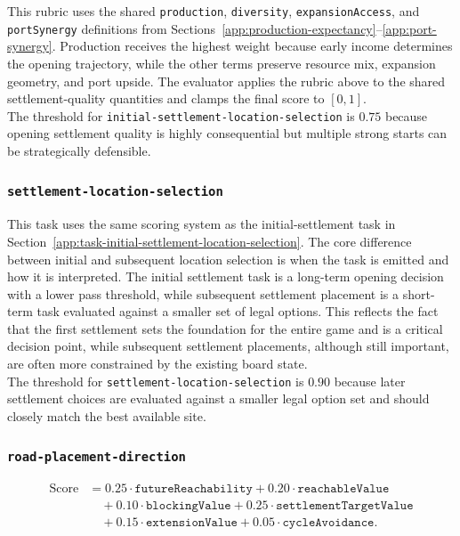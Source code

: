 \documentclass{article}
\begin{document}
This rubric uses the shared \texttt{production}, \texttt{diversity}, \texttt{expansionAccess}, and \texttt{portSynergy} definitions from Sections~\ref{app:production-expectancy}--\ref{app:port-synergy}. Production receives the highest weight because early income determines the opening trajectory, while the other terms preserve resource mix, expansion geometry, and port upside.
The evaluator applies the rubric above to the shared settlement-quality quantities and clamps the final score to $[0,1]$. 
\\
The threshold for \texttt{initial-settlement-location-selection} is $0.75$ because opening settlement quality is highly consequential but multiple strong starts can be strategically defensible.

\subsubsection{\texttt{settlement-location-selection}}
\label{app:task-settlement-location-selection}
This task uses the same scoring system as the initial-settlement task in Section~\ref{app:task-initial-settlement-location-selection}.
The core difference between initial and subsequent location selection is when the task is emitted and how it is interpreted. The initial settlement task is a long-term opening decision with a lower pass threshold, while subsequent settlement placement is a short-term task evaluated against a smaller set of legal options.
This reflects the fact that the first settlement sets the foundation for the entire game and is a critical decision point, while subsequent settlement placements, although still important, are often more constrained by the existing board state.
\\
The threshold for \texttt{settlement-location-selection} is $0.90$ because later settlement choices are evaluated against a smaller legal option set and should closely match the best available site.

\subsubsection{\texttt{road-placement-direction}}
\label{app:task-road-placement-direction}
\[
\begin{aligned}
\text{Score} &=
0.25 \cdot \texttt{futureReachability}
+ 0.20 \cdot \texttt{reachableValue} \\
&\quad + 0.10 \cdot \texttt{blockingValue}
+ 0.25 \cdot \texttt{settlementTargetValue} \\
&\quad + 0.15 \cdot \texttt{extensionValue}
+ 0.05 \cdot \texttt{cycleAvoidance}.
\end{aligned}
\]
\end{document}
